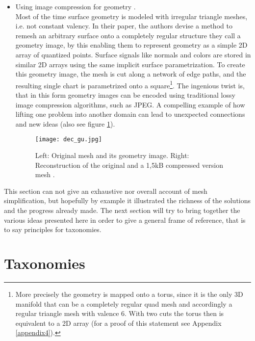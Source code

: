 \begin{itemize}
    \item Using image compression for geometry \citep[cf.][]{Gu2002}.\\
Most of the time surface geometry is modeled with irregular triangle meshes, i.e. not constant valency. In their paper, the authors devise a method to remesh an arbitrary surface onto a completely regular structure they call a geometry image, by this enabling them to represent geometry as a simple 2D array of quantized points. Surface signals like normals and colors are stored in similar 2D arrays using the same implicit surface parametrization. To create this geometry image, the mesh is cut along a network of edge paths, and the resulting single chart is parametrized onto a square\footnote{ More precisely the geometry is mapped onto a torus, since it is the only 3D manifold that can be a completely regular quad mesh and accordingly a regular triangle mesh with valence 6. With two cuts the torus then is equivalent to a 2D array (for a proof of this statement see Appendix \ref{appendix4}).}. The ingenious twist is, that in this form geometry images can be encoded using traditional lossy image compression algorithms, such as JPEG.
A compelling example of how lifting one problem into another domain can lead to unexpected connections and new ideas (also see figure \ref{fig:dec_gu}).
\begin{figure}[ht]
\centering
\texttt{[image: dec\_gu.jpg]}
\caption{Left: Original mesh and its geometry image. Right: Reconstruction of the original and a 1,5kB compressed version mesh \citep[][p.356]{Gu2002}.}
\label{fig:dec_gu}
\end{figure}
\end{itemize}
This section can not give an exhaustive nor overall account of mesh simplification, but hopefully by example it illustrated the richness of the solutions and the progress already made.
The next section will try to bring together the various ideas presented here in order to give a general frame of reference, that is to say principles for taxonomies.

\newpage	
\section{Taxonomies}
\label{simplification3}

